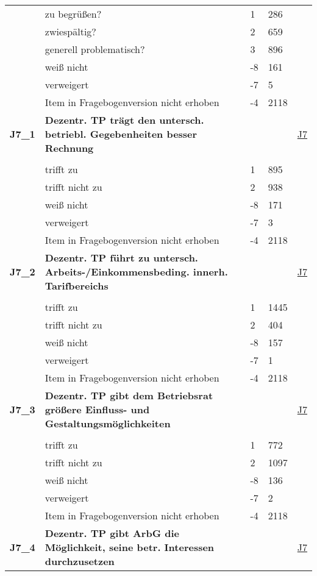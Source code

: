\begin{longtable}{| L{2.5cm} | L{8.25cm}| C{1.5cm} | R{1.25cm} | C{2.25cm} |  }
   & zu begrüßen? & 1 & 286 &  \\ 
   & zwiespältig? & 2 & 659 &  \\ 
   & generell problematisch? & 3 & 896 &  \\ 
   & weiß nicht & -8 & 161 &  \\ 
   & verweigert & -7 & 5 &  \\ 
   & Item in Fragebogenversion nicht erhoben & -4 & 2118 &  \\ 
   \midrule
\textbf{J7\_1}\label{var:suf:J7:1} & \textbf{Dezentr. TP trägt den untersch. betriebl. Gegebenheiten besser Rechnung} &  &  & \hyperref[J7]{J7} \\ 
   &  &  &  &  \\ 
   & trifft zu & 1 & 895 &  \\ 
   & trifft nicht zu & 2 & 938 &  \\ 
   & weiß nicht & -8 & 171 &  \\ 
   & verweigert & -7 & 3 &  \\ 
   & Item in Fragebogenversion nicht erhoben & -4 & 2118 &  \\ 
   \midrule
\textbf{J7\_2}\label{var:suf:J7:2} & \textbf{Dezentr. TP führt zu untersch. Arbeits-/Einkommensbeding. innerh. Tarifbereichs} &  &  & \hyperref[J7]{J7} \\ 
   &  &  &  &  \\ 
   & trifft zu & 1 & 1445 &  \\ 
   & trifft nicht zu & 2 & 404 &  \\ 
   & weiß nicht & -8 & 157 &  \\ 
   & verweigert & -7 & 1 &  \\ 
   & Item in Fragebogenversion nicht erhoben & -4 & 2118 &  \\ 
   \midrule
\textbf{J7\_3}\label{var:suf:J7:3} & \textbf{Dezentr. TP gibt dem Betriebsrat größere Einfluss- und Gestaltungsmöglichkeiten} &  &  & \hyperref[J7]{J7} \\ 
   &  &  &  &  \\ 
   & trifft zu & 1 & 772 &  \\ 
   & trifft nicht zu & 2 & 1097 &  \\ 
   & weiß nicht & -8 & 136 &  \\ 
   & verweigert & -7 & 2 &  \\ 
   & Item in Fragebogenversion nicht erhoben & -4 & 2118 &  \\ 
   \midrule
\textbf{J7\_4}\label{var:suf:J7:4} & \textbf{Dezentr. TP gibt ArbG die Möglichkeit, seine betr. Interessen durchzusetzen} &  &  & \hyperref[J7]{J7} \\ 

\end{longtable}
